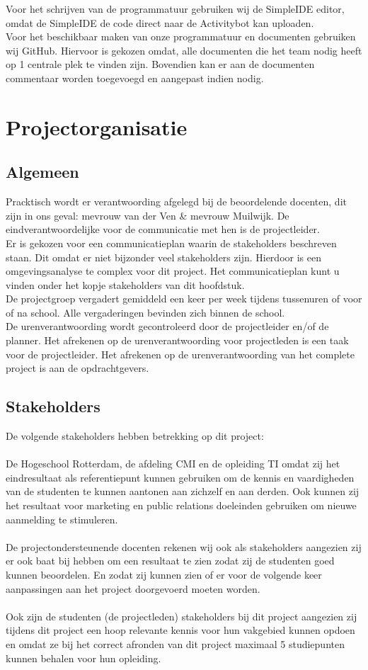 \documentclass[oneside]{book}
\begin{document}
Voor het schrijven van de programmatuur gebruiken wij de SimpleIDE editor, omdat de SimpleIDE de code direct naar de Activitybot kan uploaden.\\

Voor het beschikbaar maken van onze programmatuur en documenten gebruiken wij GitHub. Hiervoor is gekozen omdat, alle documenten die het team nodig heeft op 1 centrale plek te vinden zijn. 
Bovendien kan er aan de documenten commentaar worden toegevoegd en aangepast indien nodig.
\clearpage
\chapter{Projectorganisatie}
\section*{Algemeen}
Pracktisch wordt er verantwoording afgelegd bij de beoordelende docenten, dit zijn in ons geval: mevrouw van der Ven \& mevrouw Muilwijk.
De eindverantwoordelijke voor de communicatie met hen is de projectleider.\\
Er is gekozen voor een communicatieplan waarin de stakeholders beschreven staan.
Dit omdat er niet bijzonder veel stakeholders zijn.
Hierdoor is een omgevingsanalyse te complex voor dit project.
Het communicatieplan kunt u vinden onder het kopje stakeholders van dit hoofdstuk.\\
De projectgroep vergadert gemiddeld een keer per week tijdens tussenuren of voor of na school.
Alle vergaderingen bevinden zich binnen de school.\\
De urenverantwoording wordt gecontroleerd door de projectleider en/of de planner.
Het afrekenen op de urenverantwoording voor projectleden is een taak voor de projectleider.
Het afrekenen op de urenverantwoording van het complete project is aan de opdrachtgevers.
\section*{Stakeholders}
De volgende stakeholders hebben betrekking op dit project:\\
\\
De Hogeschool Rotterdam, de afdeling CMI en de opleiding TI omdat zij het eindresultaat als
referentiepunt kunnen gebruiken om de kennis en vaardigheden van de studenten te kunnen
aantonen aan zichzelf en aan derden.
Ook kunnen zij het resultaat voor marketing en public relations doeleinden gebruiken om nieuwe
aanmelding te stimuleren.\\
\\
De projectondersteunende docenten rekenen wij ook als stakeholders aangezien zij er ook baat bij hebben om een resultaat te zien zodat zij de studenten goed kunnen beoordelen.
En zodat zij kunnen zien of er voor de volgende keer aanpassingen aan het project doorgevoerd
moeten worden.\\
\\
Ook zijn de studenten (de projectleden) stakeholders bij dit project aangezien zij tijdens dit project
een hoop relevante kennis voor hun vakgebied kunnen opdoen en omdat ze bij het correct afronden
van dit project maximaal 5 studiepunten kunnen behalen voor hun opleiding.
\clearpage
\end{document}
